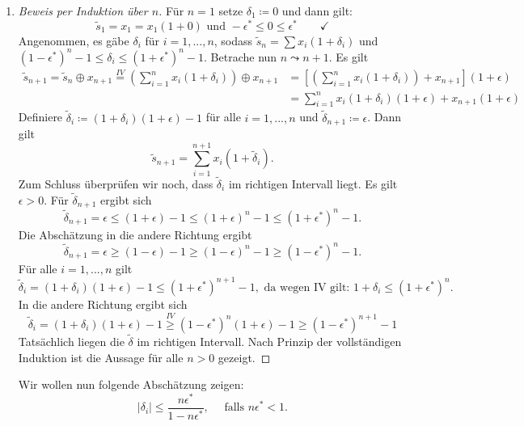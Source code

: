 \documentclass[9pt]{extarticle}
\theoremstyle{named}
\begin{document}
\begin{enumerate}[label=(\alph*)]
	\item \begin{proof}[Beweis per Induktion über $n$]
		Für $n=1$ setze $\delta_1 \coloneqq 0$ und dann gilt:
		\[
			\tilde s_1 = x_1 = x_1(1+0) \text{ und } -\epsilon^{*} \leq 0 \leq \epsilon^{*} \quad \quad \checkmark
		\]
		Angenommen, es gäbe $\delta_i$ für $i=1,...,n$, sodass $\tilde s_n = \sum x_i(1+\delta_i)$ und $(1-\epsilon^*)^n-1 \leq \delta_i \leq (1+\epsilon^*)^n-1$. Betrache nun $n \leadsto n+1$. Es gilt
		\begin{align*}
			\tilde s_{n+1} = \tilde s_n \oplus x_{n+1} \overset{IV}{=} \left(\sum^n_{i=1} x_i(1+\delta_i)\right) \oplus x_{n+1} &= [\left(\sum^n_{i=1} x_i(1+\delta_i)\right) + x_{n+1} ](1+\epsilon)\\ &= \sum^n_{i=1} x_i(1+\delta_i)(1+\epsilon) + x_{n+1}(1+\epsilon)
		\end{align*}
		Definiere $\tilde \delta_i \coloneqq (1+\delta_i)(1+\epsilon) - 1$ für alle $i = 1,...,n$ und $\tilde \delta_{n+1} \coloneqq \epsilon$. Dann gilt
		\[
			\tilde s_{n+1} = \sum^{n+1}_{i=1} x_i(1 + \tilde \delta_i).
		\]
	 	Zum Schluss überprüfen wir noch, dass $\tilde \delta_i$ im richtigen Intervall liegt. Es gilt $\epsilon > 0$. Für $\tilde \delta_{n+1}$ ergibt sich
	 	\[
	 			 	\tilde \delta_{n+1} = \epsilon \leq (1+\epsilon)-1 \leq (1+\epsilon)^n-1 \leq (1+\epsilon^*)^n-1.
	 	\]
		Die Abschätzung in die andere Richtung ergibt
		\[
				 	\tilde \delta_{n+1} = \epsilon \geq (1-\epsilon)-1 \geq (1-\epsilon)^n-1 \geq (1-\epsilon^*)^n-1.
		\]
		Für alle $i = 1,...,n$ gilt 
		\[
			\tilde \delta_i = (1+\delta_i)(1+\epsilon) -1 \leq (1+\epsilon^*)^{n+1}-1, \text{ da wegen IV gilt: } 1+\delta_i \leq (1+\epsilon^*)^n.
		\]
		In die andere Richtung ergibt sich
		\[
			\tilde \delta_i = (1+\delta_i)(1+\epsilon) -1 \overset{IV}{\geq} (1-\epsilon^*)^n(1+\epsilon) - 1 \geq (1-\epsilon^*)^{n+1}-1
		\]
		Tatsächlich liegen die $\tilde \delta$ im richtigen Intervall. Nach Prinzip der vollständigen Induktion ist die Aussage für alle $n>0$ gezeigt.
		\end{proof}
		
		Wir wollen nun folgende Abschätzung zeigen:
		\[
			|\delta_i| \leq \frac{n\epsilon^*}{1-n\epsilon^*}, \quad \text{ falls } n\epsilon^* <1.
		\]


\end{enumerate}
\end{document}
